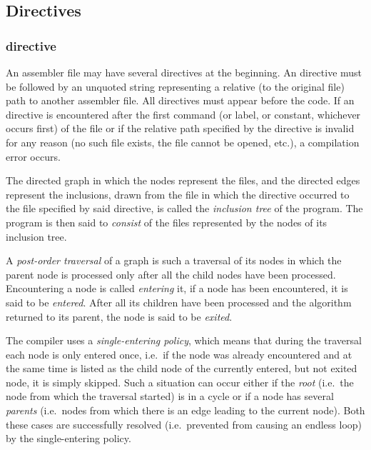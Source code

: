 \subsection{Directives}
\subsubsection{ directive}

\vspace{-0.2cm}

An assembler file may have several  directives at the beginning.
An  directive must be followed by an unquoted string
representing a relative (to the original file) path to another assembler file.
All  directives must appear before the code.
If an  directive is encountered after the first command
(or label, or constant, whichever occurs first) of the file or if the
relative path specified by the directive is invalid for any reason
(no such file exists, the file cannot be opened, etc.),
a compilation error occurs.

The directed graph in which the nodes represent the files, and the directed
edges represent the inclusions, drawn from the file in which
the  directive occurred to the file specified by said directive,
is called the \textit{inclusion tree} of the program.
The program is then said to \textit{consist} of the files represented
by the nodes of its inclusion tree.

A \textit{post-order traversal} of a graph is such a traversal of its nodes
in which the parent node is processed only after all the child nodes have been
processed.
Encountering a node is called \textit{entering} it, if a node has been
encountered, it is said to be \textit{entered}.
After all its children have been processed and the algorithm returned
to its parent, the node is said to be \textit{exited}.

The  compiler uses a \textit{single-entering policy}, which
means that during the traversal each node is only entered once, i.e.\ if
the node was already encountered and at the same time is listed as the child
node of the currently entered, but not exited node, it is simply skipped.
Such a situation can occur either if the \textit{root}
(i.e.\ the node from which the traversal started) is in a cycle or
if a node has several \textit{parents} (i.e.\ nodes from which there is
an edge leading to the current node).
Both these cases are successfully resolved (i.e.\ prevented from causing
an endless loop) by the single-entering policy.

